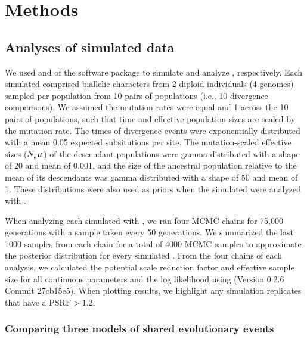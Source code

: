 \documentclass[letterpaper,12pt]{article}
\begin{document}
\section{Methods}

\subsection{Analyses of simulated data}

We used \simcoevolity and \ecoevolity of the \ecoevolity software
package
\citep[Version 0.3.2 Commit c1685dfa][]{Oaks2018ecoevolity}
to simulate and analyze \datasets, respectively.
Each simulated \dataset comprised biallelic characters from 2 diploid
individuals (4 genomes) sampled per population from 10 pairs of populations
(i.e., 10 divergence comparisons).
We assumed the mutation rates were equal and 1 across the 10 pairs of
populations, such that time and effective population sizes are scaled by the
mutation rate.
The times of divergence events were exponentially distributed with a mean 0.05
expected subsitutions per site.
The mutation-scaled effective sizes ($N_{e}^{}\mu_{}$) of the descendant
populations were gamma-distributed with a shape of 20 and mean of 0.001,
and the size of the ancestral population relative to the mean of its
descendants was gamma distributed with a shape of 50 and mean of 1.
These distributions were also used as priors when the simulated \datasets were
analyzed with \ecoevolity.


When analyzing each simulated \dataset with \ecoevolity,
we ran four MCMC chains for 75,000 generations with a sample taken every 50
generations.
We summarized the last 1000 samples from each chain for a total of 4000 MCMC
samples to approximate the posterior distribution for every simulated \dataset.
From the four chains of each analysis, we calculated the potential
scale reduction factor \citep[PSRF; the square root of Equation 1.1
in][]{Brooks1998} and effective sample size \citep[ESS;][]{Gong2014} for all
continuous parameters and the log likelihood using
\pycoevolity (Version 0.2.6 Commit 27cb15e5).
When plotting results, we highlight any simulation replicates that have a
$\textrm{PSRF} > 1.2$.


\subsubsection{Comparing three models of shared evolutionary events}
\end{document}
